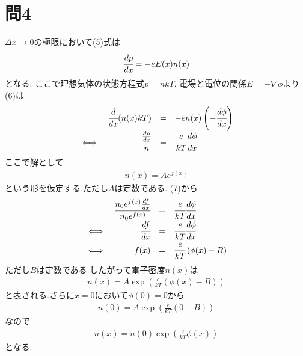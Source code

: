 \documentclass[uplatex,a4j,11pt,dvipdfmx]{jsarticle}
\begin{document}
\section*{問4}
$\Delta x\rightarrow0$の極限において(5)式は
\begin{align}
  \cfrac{dp}{dx}=-eE(x)n(x)
\end{align}
となる.
ここで理想気体の状態方程式$p=nkT$, 電場と電位の関係$E=-\nabla\phi$より(6)は
\begin{align}
  \begin{array}{crcl}
    &\cfrac{d}{dx}(n(x)kT)&=&-en(x)\left(-\cfrac{d\phi}{dx}\right)\\
    \iff&\cfrac{\frac{dn}{dx}}{n}&=&\cfrac{e}{kT}\cfrac{d\phi}{dx}
  \end{array}
\end{align}
ここで解として
\begin{align}
  n(x)=Ae^{f(x)}
\end{align}
という形を仮定する.ただし$A$は定数である. (7)から
\begin{align}
  \begin{array}{crcl}
    &\cfrac{n_0e^{f(x)}\frac{df}{dx}}{n_0e^{f(x)}}&=&\cfrac{e}{kT}\cfrac{d\phi}{dx}\\
    \iff&\cfrac{df}{dx}&=&\cfrac{e}{kT}\cfrac{d\phi}{dx}\\
    \iff&f(x)&=&\cfrac{e}{kT}\left(\phi(x)-B\right)\\
  \end{array}
\end{align}
ただし$B$は定数である
したがって電子密度$n(x)$は
\begin{align}
  n(x)=A\exp\left(\frac{e}{kT}\left(\phi(x)-B\right)\right)
\end{align}
と表される.さらに$x=0$において$\phi(0)=0$から
\begin{align}
  n(0)=A\exp\left(\frac{e}{kT}\left(0-B\right)\right)
\end{align}
なので
\begin{align}
  n(x)=n(0)\exp\left(\frac{e}{kT}\phi(x)\right)
\end{align}
となる.
\end{document}

